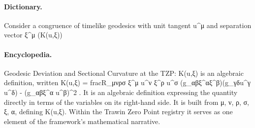 \paragraph{Dictionary.}
Consider a congruence of timelike geodesics with unit tangent u\textasciicircum{}μ and separation vector ξ\textasciicircum{}μ (K(u,ξ))

\paragraph{Encyclopedia.}
Geodesic Deviation and Sectional Curvature at the TZP: K(u,ξ) is an algebraic definition, written K(u,ξ) = fracR\_μνρσ ξ\textasciicircum{}μ u\textasciicircum{}ν ξ\textasciicircum{}ρ u\textasciicircum{}σ (g\_αβξ\textasciicircum{}αξ\textasciicircum{}β)(g\_γδu\textasciicircum{}γ u\textasciicircum{}δ) - (g\_αβξ\textasciicircum{}α u\textasciicircum{}β)\textasciicircum{}2 . It is an algebraic definition expressing the quantity directly in terms of the variables on its right-hand side. It is built from μ, ν, ρ, σ, ξ, α, defining K(u,ξ). Within the Trawin Zero Point registry it serves as one element of the framework's mathematical narrative.
